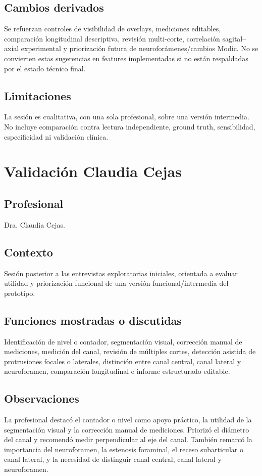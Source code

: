 \subsection*{Cambios derivados}
Se refuerzan controles de visibilidad de overlays, mediciones editables, comparación longitudinal descriptiva, revisión multi-corte, correlación sagital--axial experimental y priorización futura de neuroforámenes/cambios Modic. No se convierten estas sugerencias en features implementadas si no están respaldadas por el estado técnico final.

\subsection*{Limitaciones}
La sesión es cualitativa, con una sola profesional, sobre una versión intermedia. No incluye comparación contra lectura independiente, ground truth, sensibilidad, especificidad ni validación clínica.

\section{Validación Claudia Cejas}
\label{anexo:h-validacion-claudia}

\subsection*{Profesional}
Dra. Claudia Cejas.

\subsection*{Contexto}
Sesión posterior a las entrevistas exploratorias iniciales, orientada a evaluar utilidad y priorización funcional de una versión funcional/intermedia del prototipo.

\subsection*{Funciones mostradas o discutidas}
Identificación de nivel o contador, segmentación visual, corrección manual de mediciones, medición del canal, revisión de múltiples cortes, detección asistida de protrusiones focales o laterales, distinción entre canal central, canal lateral y neuroforamen, comparación longitudinal e informe estructurado editable.

\subsection*{Observaciones}
La profesional destacó el contador o nivel como apoyo práctico, la utilidad de la segmentación visual y la corrección manual de mediciones. Priorizó el diámetro del canal y recomendó medir perpendicular al eje del canal. También remarcó la importancia del neuroforamen, la estenosis foraminal, el receso subarticular o canal lateral, y la necesidad de distinguir canal central, canal lateral y neuroforamen.

